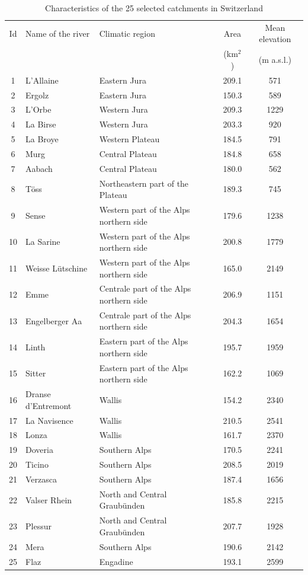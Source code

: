 \documentclass[draft]{agujournal2019}
\begin{document}
\begin{table}
	\centering
	\caption{Characteristics of the 25 selected catchments in Switzerland}
	\begin{tabular}{cllcc}
		\hline 
		Id & Name of the river & Climatic region & Area & Mean elevation \\
		& & & (km$^2$) & (m a.s.l.) \\
		\hline 
		1 & L'Allaine & Eastern Jura & 209.1 & 571 \\
		2 & Ergolz & Eastern Jura & 150.3 & 589 \\
		3 & L'Orbe & Western Jura & 209.3 & 1229 \\
		4 & La Birse & Western Jura & 203.3 & 920 \\
		5 & La Broye & Western Plateau & 184.5 & 791 \\
		6 & Murg & Central Plateau & 184.8 & 658 \\
		7 & Aabach & Central Plateau & 180.0 & 562 \\
		8 & T\"oss & Northeastern part of the Plateau & 189.3 & 745 \\
		9 & Sense & Western part of the Alps northern side & 179.6 & 1238 \\
		10 & La Sarine & Western part of the Alps northern side & 200.8 & 1779 \\
		11 & Weisse L\"utschine & Western part of the Alps northern side & 165.0 & 2149 \\
		12 & Emme & Centrale part of the Alps northern side & 206.9 & 1151 \\
		13 & Engelberger Aa & Centrale part of the Alps northern side & 204.3 & 1654 \\
		14 & Linth & Eastern part of the Alps northern side & 195.7 & 1959 \\
		15 & Sitter & Eastern part of the Alps northern side & 162.2 & 1069 \\
		16 & Dranse d'Entremont & Wallis & 154.2 & 2340 \\
		17 & La Navisence & Wallis & 210.5 & 2541 \\
		18 & Lonza & Wallis & 161.7 & 2370 \\
		19 & Doveria & Southern Alps & 170.5 & 2241 \\
		20 & Ticino & Southern Alps & 208.5 & 2019 \\
		21 & Verzasca & Southern Alps & 187.4 & 1656 \\
		22 & Valser Rhein & North and Central Graubünden & 185.8 & 2215 \\
		23 & Plessur & North and Central Graubünden & 207.7 & 1928 \\
		24 & Mera & Southern Alps & 190.6 & 2142 \\
		25 & Flaz & Engadine & 193.1 & 2599 \\
		\hline 
	\end{tabular} 
	\label{catchments}
\end{table}
\end{document}
